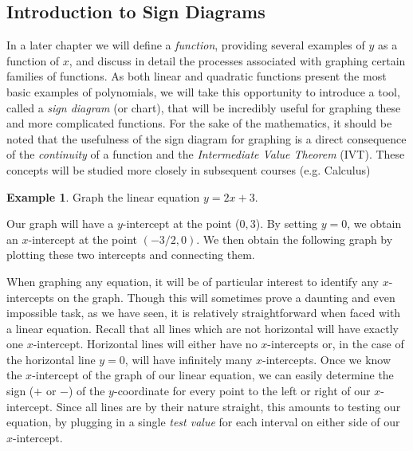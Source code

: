 \documentclass[12pt]{book}
\theoremstyle{definition}
\newtheorem{example}{Example}
\begin{document}
\subsection{Introduction to Sign Diagrams}
In a later chapter we will define a {\it function}, providing several examples of $y$ as a function of $x$, and discuss in detail the processes associated with graphing certain families of functions.  As both linear and quadratic functions present the most basic examples of polynomials, we will take this opportunity to introduce a tool, called a {\it sign diagram} (or chart), that will be incredibly useful for graphing these and more complicated functions.  For the sake of the mathematics, it should be noted that the usefulness of the sign diagram for graphing is a direct consequence of the {\it continuity} of a function and the {\it Intermediate Value Theorem} (IVT).  These concepts will be studied more closely in subsequent courses (e.g. Calculus)
\begin{example}\label{Lin97} Graph the linear equation $y=2x+3$.\par
Our graph will have a $y$-intercept at the point ($0,3$).  By setting $y=0$, we obtain an $x$-intercept at the point $(-3/2,0)$.  We then obtain the following graph by plotting these two intercepts and connecting them.
\begin{center}
\end{center}
\end{example}
When graphing any equation, it will be of particular interest to identify any $x$-intercepts on the graph.  Though this will sometimes prove a daunting and even impossible task, as we have seen, it is relatively straightforward when faced with a linear equation.  Recall that all lines which are not horizontal will have exactly one $x$-intercept.  Horizontal lines will either have no $x$-intercepts or, in the case of the horizontal line $y=0$, will have infinitely many $x$-intercepts.  Once we know the $x$-intercept of the graph of our linear equation, we can easily determine the sign ($+$ or $-$) of the $y$-coordinate for every point to the left or right of our $x$-intercept.  Since all lines are by their nature straight, this amounts to testing our equation, by plugging in a single {\it test value} for each interval on either side of our $x$-intercept.\par
\end{document}
